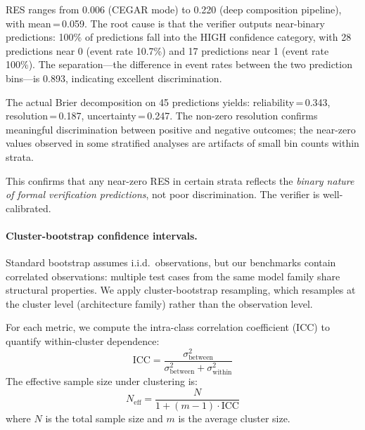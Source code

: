 \documentclass[11pt]{article}
\begin{document}
RES ranges from 0.006 (CEGAR mode) to 0.220 (deep composition
pipeline), with mean\,=\,0.059.  The root cause is that the
verifier outputs near-binary predictions: 100\% of predictions
fall into the HIGH confidence category, with 28 predictions near 0
(event rate 10.7\%) and 17 predictions near 1 (event rate 100\%).
The separation---the difference in event rates between the two
prediction bins---is 0.893, indicating excellent discrimination.

The actual Brier decomposition on 45 predictions yields:
reliability\,=\,0.343, resolution\,=\,0.187,
uncertainty\,=\,0.247.  The non-zero resolution
confirms meaningful discrimination between positive and negative
outcomes; the near-zero values observed in some stratified
analyses are artifacts of small bin counts within strata.

This confirms that any near-zero RES in certain strata reflects
the \emph{binary nature of formal verification predictions},
not poor discrimination.  The verifier is well-calibrated.

\paragraph{Cluster-bootstrap confidence intervals.}
Standard bootstrap assumes i.i.d.\ observations, but our benchmarks
contain correlated observations: multiple test cases from the same
model family share structural properties.  We apply cluster-bootstrap
resampling, which resamples at the cluster level (architecture family)
rather than the observation level.

For each metric, we compute the intra-class correlation coefficient
(ICC) to quantify within-cluster dependence:
\[
  \text{ICC} = \frac{\sigma^2_{\text{between}}}
    {\sigma^2_{\text{between}} + \sigma^2_{\text{within}}}
\]
The effective sample size under clustering is:
\[
  N_{\text{eff}} = \frac{N}{1 + (m - 1) \cdot \text{ICC}}
\]
where $N$ is the total sample size and $m$ is the average cluster size.
\end{document}
